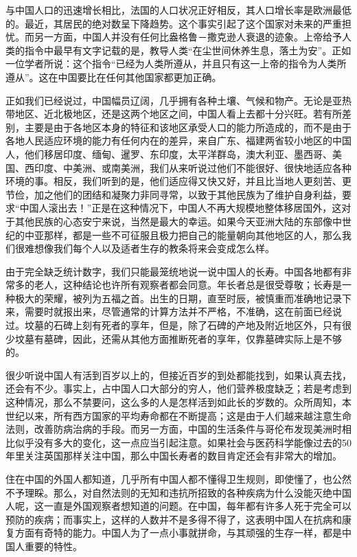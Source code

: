 \documentclass[12pt,oneside]{book}
\begin{document}
\begin{common-format}
与中国人口的迅速增长相比，法国的人口状况正好相反，其人口增长率是欧洲最低的。最近，其居民的绝对数呈下降趋势。这个事实引起了这个国家对未来的严重担忧。而另一方面，中国人并没有任何比盎格鲁－撒克逊人衰退的迹象。上帝给予人类的指令中最早有文字记载的是，教导人类“在尘世间休养生息，落土为安”。正如一位学者所说：这个指令“已经为人类所遵从，并且只有这一上帝的指令为人类所遵从”。这在中国要比在任何其他国家都更加正确。 

正如我们已经说过，中国幅员辽阔，几乎拥有各种土壤、气候和物产。无论是亚热带地区、近北极地区，还是这两个地区之间，中国人看上去都十分兴旺。若有所差别，主要是由于各地区本身的特征和该地区承受人口的能力所造成的，而不是由于各地人民适应环境的能力有任何内在的差异，来自广东、福建两省较小地区的中国人，他们移居印度、缅甸、暹罗、东印度，太平洋群岛，澳大利亚、墨西哥、美国、西印度、中美洲、或南美洲，我们从来听说过他们不能很好、很快地适应各种环境的事。相反，我们听到的是，他们适应得又快又好，并且比当地人更刻苦、更节俭，加之他们的团结和凝聚力非同寻常，以致于其他民族为了维护自身利益，要求“中国人滚出去！”正是在这种情况下，中国人不再大规模地整体移居国外，这对于其他民族的心态安宁来说，当然是最大的幸运。如果今天亚洲大陆的东部像中世纪的中亚那样，都是一些不可征服且极力把自己的能量朝向其他地区的人，那么我们很难想像我们每个人以及适者生存的教条将来会变成怎么样。 

由于完全缺乏统计数字，我们只能最笼统地说一说中国人的长寿。中国各地都有非常多的老人，这种结论也许所有观察者都会同意。年长者总是很受尊敬；长寿是一种极大的荣耀，被列为五福之首。出生的日期，直至时辰，被慎重而准确地记录下来，需要时就报出来，尽管通常的计算方法并不严格，不准确，这在前面已经说过。坟墓的石碑上刻有死者的享年，但是，除了石碑的产地及附近地区外，只有很少坟墓有墓碑，因此，还需从其他方面推断死者的享年，仅靠墓碑实际上是不够的。 

很少听说中国人有活到百岁以上的，但接近百岁的到处都能找到，如果认真去找，还会有不少。事实上，占中国人口大部分的穷人，他们营养极度缺乏；若是考虑到这种情况，那么不禁要问，这么多的人是怎样活到如此长的岁数的。众所周知，本世纪以来，所有西方国家的平均寿命都在不断提高；这是由于人们越来越注意生命法则，改善防病治病的手段。而另一方面，中国的生活条件与哥伦布发现美洲时相比似乎没有多大的变化，这一点应当引起注意。如果社会与医药科学能像过去的50年里关注英国那样关注中国，那么中国长寿者的数目肯定还会有非常大的增加。 

住在中国的外国人都知道，几乎所有中国人都不懂得卫生规则，即使懂了，也公然不予理睬。那么，对自然法则的无知和违抗所招致的各种疾病为什么没能灭绝中国人呢，这一直是外国观察者想知道的问题。在中国，每年都有许多人死于完全可以预防的疾病；而事实上，这样的人数并不是多得不得了，这表明中国人在抗病和康复方面有奇特的能力。中国人为了一点小事就拼命，与其顽强的生存一样，都是中国人重要的特性。 


\end{common-format}
\end{document}
